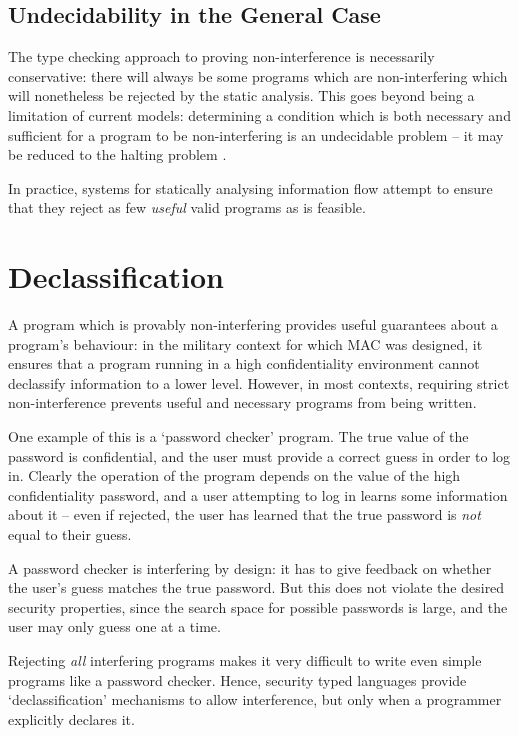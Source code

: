\subsection{Undecidability in the General Case}

The type checking approach to proving non-interference is necessarily conservative: there will always be some programs which are non-interfering which will nonetheless be rejected by the static analysis. This goes beyond being a limitation of current models: determining a condition which is both necessary and sufficient for a program to be non-interfering is an undecidable problem \cite{denning1977certification} \cite{landi1992undecidability} -- it may be reduced to the halting problem \cite{sabelfeld2003if}.

In practice, systems for statically analysing information flow attempt to ensure that they reject as few \textit{useful} valid programs as is feasible.

\section{Declassification}

A program which is provably non-interfering provides useful guarantees about a program's behaviour: in the military context for which MAC was designed, it ensures that a program running in a high confidentiality environment cannot declassify information to a lower level. However, in most contexts, requiring strict non-interference prevents useful and necessary programs from being written.

One example of this is a `password checker' program. The true value of the password is confidential, and the user must provide a correct guess in order to log in. Clearly the operation of the program depends on the value of the high confidentiality password, and a user attempting to log in learns some information about it -- even if rejected, the user has learned that the true password is \textit{not} equal to their guess.

A password checker is interfering by design: it has to give feedback on whether the user's guess matches the true password. But this does not violate the desired security properties, since the search space for possible passwords is large, and the user may only guess one at a time.

Rejecting \textit{all} interfering programs makes it very difficult to write even simple programs like a password checker. Hence, security typed languages provide `declassification' mechanisms to allow interference, but only when a programmer explicitly declares it.

